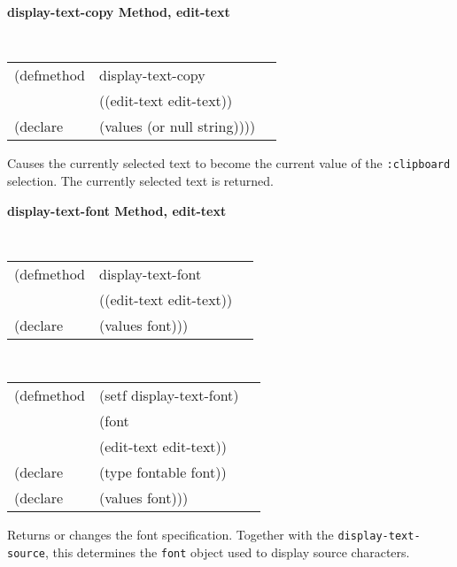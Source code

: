 {\samepage
{\large {\bf display-text-copy \hfill Method, edit-text}}
\begin{flushright} \parbox[t]{6.125in}{
\tt
\begin{tabular}{lll}
\raggedright
(defmethod & display-text-copy & \\
           & ((edit-text  edit-text)) \\
(declare   & (values (or null string))))
\end{tabular}
\rm

}\end{flushright}}

\begin{flushright} \parbox[t]{6.125in}{
Causes the currently selected text to become the
current value of the {\tt :clipboard} selection. The currently selected text is returned. 

}\end{flushright}



{\samepage  
{\large {\bf display-text-font \hfill Method, edit-text}}
\begin{flushright} \parbox[t]{6.125in}{
\tt
\begin{tabular}{lll}
\raggedright
(defmethod & display-text-font & \\
& ((edit-text  edit-text)) \\
(declare & (values font)))
\end{tabular}
\rm

}\end{flushright}}

\begin{flushright} \parbox[t]{6.125in}{
\tt
\begin{tabular}{lll}
\raggedright
(defmethod & (setf display-text-font) & \\
         & (font \\
         & (edit-text  edit-text)) \\
(declare &(type fontable  font))\\
(declare & (values font)))
\end{tabular}
\rm}
\end{flushright}

\begin{flushright} \parbox[t]{6.125in}{
Returns or changes the font specification. Together
with the {\tt display-text-source}, this determines the {\tt font}
object used to display source characters.
}
\end{flushright}



